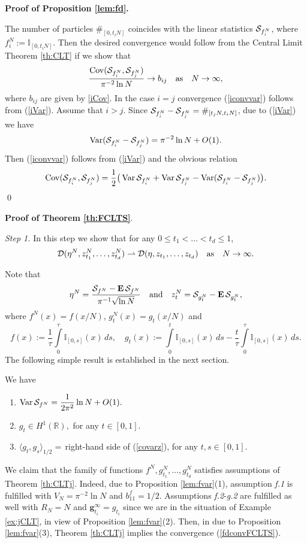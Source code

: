\documentclass{article}
\numberwithin{equation}{section}
\newcommand{\mR}{\mathbb{R}}
\newcommand{\mI}{\mathbb{I}}
\newcommand{\DD}{{\cal D}}
\newcommand{\SSS}{{\cal S}}
\newcommand{\Cov}{\operatorname{Cov}}
\newcommand{\Var}{\operatorname{Var}}
\newcommand{\ssk}{\smallskip}
\newcommand{\MO}{\mbox{\bf E}\,}
\newcommand{\ds}{\displaystyle{}}
\newcommand{\ra}{\rightarrow}
\newcommand{\ran}{\rangle}
\newcommand{\lan}{\langle}
\newcommand{\raw}{\rightharpoonup}
\newcommand{\fr}{\frac}
\newcommand{\qmb}{\quad\mbox}
\newcommand{\qu}{\quad}
\newcommand{\ili}{\int\limits}
\newcommand{\lbl}{\label}
\newcommand{\ass}{\quad\mbox{as}\quad}
\newcommand{\rprop}{Proposition \nolinebreak}
\newcommand{\rtheo}{Theorem \nolinebreak}
\newcommand{\bee}{\begin{equation}}
\newcommand{\eee}{\end{equation}}
\newcommand{\bpp}{\begin{prop}}
\newcommand{\epp}{\end{prop}}
\newcommand{\non}{\nonumber}
\begin{document}
\ssk
{\bf Proof of Proposition \ref{lem:fd}.}


The number of particles $\#_{[0,t_iN]}$
coincides with the linear statistics $\SSS_{f_i^N}$,
where $f_i^N:=\mI_{[0,t_i N]}$.
Then the desired convergence would follow from the
Central Limit \rtheo \ref{th:CLT}
if we show that
\bee\lbl{iconvvar}
\fr{\Cov(\SSS_{f_i^N},\SSS_{f_j^N})}{\pi^{-2}\ln N}
\ra b_{ij} \ass N\ra\infty,
\eee
where $b_{ij}$ are given by \eqref{iCov}.
In the case $i=j$ convergence (\ref{iconvvar})
follows from (\ref{iVar}).
Assume that $i>j$.
Since $\SSS_{f_i^N}-\SSS_{f_j^N}=\#_{[t_jN,t_iN]}$,
due to (\ref{iVar}) we have
\bee\non
\Var(\SSS_{f_i^N}-\SSS_{f_j^N}) = \pi^{-2}\ln N + O(1).
\eee
Then (\ref{iconvvar}) follows from (\ref{iVar}) and the obvious relation
\bee\lbl{covlog1}
\Cov (\SSS_{f^N_i},\SSS_{f_j^N})
= \fr12 \big( \Var\SSS_{f^N_i} + \Var\SSS_{f^N_j} - \Var(\SSS_{f^N_i}-\SSS_{f^N_j})\big).
\eee
\qed


{\bf Proof of Theorem \ref{th:FCLTS}}.


{\it Step 1.}
In this step we show that
for any $0\leq t_1<\ldots<t_d\leq 1$,
\bee\lbl{fdconvFCLTS}
\DD(\eta^N,z^N_{t_1},\ldots,z^N_{t_d}) \raw \DD(\eta,z_{t_1},\ldots,z_{t_d}) \ass N\ra\infty.
\eee

Note that
\bee\lbl{etaNzN}
\eta^N=\fr{\SSS_{f^N}-\MO \SSS_{f^N}}{\pi^{-1}\sqrt{\ln N}}
\qmb{and}\qu
z_t^N=\SSS_{g_t^N}-\MO \SSS_{g_t^N},
\eee
where $f^N(x)=f(x/N)$, $g_t^N(x)=g_t(x/N)$ and
\bee\lbl{mainfg}
f(x):=\fr{1}{\tau}\ili_{0}^{\tau} \mI_{[0,s]}(x)\,ds,
\qu
g_t(x):=\ili_0^t \mI_{[0,s]}(x) \,ds - \fr{t}{\tau}\ili_0^{\tau} \mI_{[0,s]}(x) \,ds.
\eee
The following simple result
is established in the next section.
\bpp\lbl{lem:fvar}
We have
\begin{enumerate}
\item
$\Var\SSS_{f^N} = \ds{\fr{1}{2\pi^2}} \ln N + O(1).$
\item
$g_t\in H^1(\mR),$ for any $t\in [0,1]$.
\item
$\lan g_{t},g_{s}\ran_{1/2}=\,$right-hand side of (\ref{covarz}),
for any $t,s\in [0,1]$.

\end{enumerate}
\epp
We claim that the family of functions
$f^N,g^N_{t_1},\ldots,g^N_{t_d}$
satisfies assumptions of \rtheo \ref{th:CLTj}.
Indeed,
due to \rprop \ref{lem:fvar}(1),
assumption \emph{f.1} is fulfilled
with $V_N=\pi^{-2}\ln N$
and
$b_{11}^f=1/2$.
Assumptions \emph{f.2}-\emph{g.2} are fulfilled as well
with $R_N=N$ and $ \bm g^\infty_{t_i}=g_{t_i}$
since
we are in the situation of
Example \ref{ex:jCLT},
in view of \rprop \ref{lem:fvar}(2).
Then, in due to \rprop \ref{lem:fvar}(3),
\rtheo \ref{th:CLTj} implies the convergence (\ref{fdconvFCLTS}).
\end{document}
